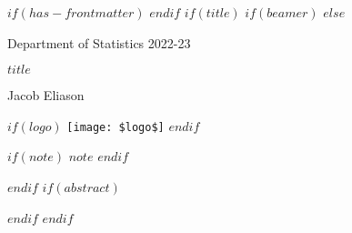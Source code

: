 $if(has-frontmatter)$
\frontmatter
$endif$
$if(title)$
$if(beamer)$
\frame{\titlepage}
$else$
\begin{titlepage}
\centering
\vspace*{3cm}

{\large Department of Statistics 2022-23\\}
\vspace{1cm}

{\Large\bfseries $title$}
\vspace{1cm}

{\large Jacob Eliason\\}
\vspace{9cm}
\begin{center}

$if(logo)$
\texttt{[image: \$logo\$]}
$endif$

\end{center}
\vspace{1cm}

$if(note)$
{\small $note$}
$endif$

\vspace{3cm}
\end{titlepage}


$endif$
$if(abstract)$
\begin{abstract}
$abstract$
\end{abstract}
$endif$
$endif$